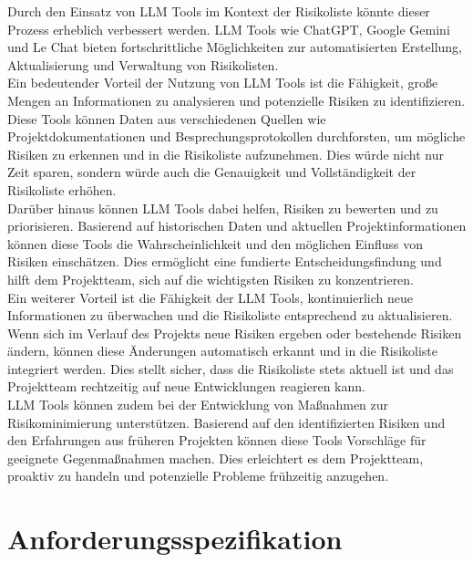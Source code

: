 Durch den Einsatz von LLM Tools im Kontext der Risikoliste könnte dieser Prozess erheblich verbessert werden. LLM Tools wie ChatGPT, 
Google Gemini und Le Chat bieten fortschrittliche Möglichkeiten zur automatisierten Erstellung, Aktualisierung und 
Verwaltung von Risikolisten.\\

Ein bedeutender Vorteil der Nutzung von LLM Tools ist die Fähigkeit, große Mengen an Informationen zu analysieren und 
potenzielle Risiken zu identifizieren. Diese Tools können Daten aus verschiedenen Quellen wie Projektdokumentationen und 
Besprechungsprotokollen durchforsten, um mögliche Risiken zu erkennen und in die Risikoliste aufzunehmen. Dies würde 
nicht nur Zeit sparen, sondern würde auch die Genauigkeit und Vollständigkeit der Risikoliste erhöhen.\\

Darüber hinaus können LLM Tools dabei helfen, Risiken zu bewerten und zu priorisieren. Basierend auf historischen Daten 
und aktuellen Projektinformationen können diese Tools die Wahrscheinlichkeit und den möglichen Einfluss von Risiken 
einschätzen. Dies ermöglicht eine fundierte Entscheidungsfindung und hilft dem Projektteam, sich auf die wichtigsten 
Risiken zu konzentrieren.\\

Ein weiterer Vorteil ist die Fähigkeit der LLM Tools, kontinuierlich neue Informationen zu überwachen und die 
Risikoliste entsprechend zu aktualisieren. Wenn sich im Verlauf des Projekts neue Risiken ergeben oder bestehende 
Risiken ändern, können diese Änderungen automatisch erkannt und in die Risikoliste integriert werden. Dies stellt 
sicher, dass die Risikoliste stets aktuell ist und das Projektteam rechtzeitig auf neue Entwicklungen reagieren kann.\\

LLM Tools können zudem bei der Entwicklung von Maßnahmen zur Risikominimierung unterstützen. Basierend auf den 
identifizierten Risiken und den Erfahrungen aus früheren Projekten können diese Tools Vorschläge für geeignete 
Gegenmaßnahmen machen. Dies erleichtert es dem Projektteam, proaktiv zu handeln und potenzielle Probleme frühzeitig 
anzugehen.

\section{Anforderungsspezifikation}  \label{Anforderungsspezifikation}

